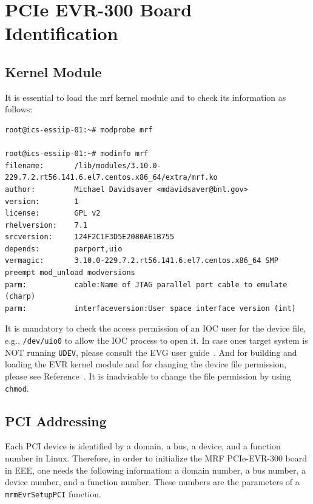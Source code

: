 \documentclass[11pt
  , a4paper
  , article
  , oneside
  , showtrims
]{memoir}
\begin{document}
\section{PCIe EVR-300 Board Identification}
         
\subsection{Kernel Module}
It is essential to load the mrf kernel module and to check its information as follows:
\begin{lstlisting}[style=termstyle]
root@ics-essiip-01:~# modprobe mrf
  
root@ics-essiip-01:~# modinfo mrf
filename:       /lib/modules/3.10.0-229.7.2.rt56.141.6.el7.centos.x86_64/extra/mrf.ko
author:         Michael Davidsaver <mdavidsaver@bnl.gov>
version:        1
license:        GPL v2
rhelversion:    7.1
srcversion:     124F2C1F3D5E2080AE1B755
depends:        parport,uio
vermagic:       3.10.0-229.7.2.rt56.141.6.el7.centos.x86_64 SMP preempt mod_unload modversions 
parm:           cable:Name of JTAG parallel port cable to emulate (charp)
parm:           interfaceversion:User space interface version (int)
\end{lstlisting}

It is mandatory to check the access permission of an IOC user for the device file, e.g., \texttt{/dev/uio0} to allow the IOC process to open it. In case ones target system is NOT running \texttt{UDEV}, please consult the EVG user guide~\cite{EVR-USER-GUIDE}. And for building and loading the EVR kernel module and for changing the device file permission, please see Reference~\citep[see][p12,13]{EVR-USER-GUIDE}. It is inadvisable to change the file permission by using \texttt{chmod}. 

\subsection{PCI Addressing}
Each PCI device is identified by a domain, a bus, a device, and a function number in Linux. Therefore, in order to initialize the MRF PCIe-EVR-300 board in EEE, one needs the following information: a domain number, a bus number, a device number, and a function number. These numbers are the parameters of a \texttt{mrmEvrSetupPCI} function.
\end{document}
